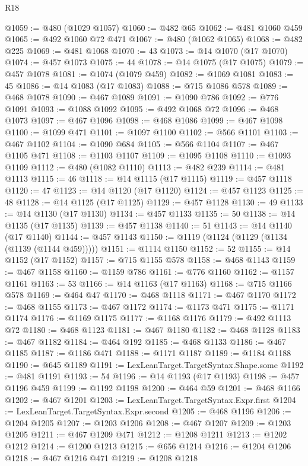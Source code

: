 \begin{lexlean}{R18}
\begin{coremodule}
@1059 := @480 (@1029 @1057)
@1060 := @482 @65
@1062 := @481 @1060 @459
@1065 := @492 @1060 @72 @471
@1067 := @480 (@1062 @1065)
@1068 := @482 @225
@1069 := @481 @1068
@1070 := 43
@1073 := @14 @1070 (@17 @1070)
@1074 := @457 @1073
@1075 := 44
@1078 := @14 @1075 (@17 @1075)
@1079 := @457 @1078
@1081 := @1074 (@1079 @459)
@1082 := @1069 @1081
@1083 := 45
@1086 := @14 @1083 (@17 @1083)
@1088 := @715 @1086 @578
@1089 := @468 @1078
@1090 := @467 @1089
@1091 := @1090 @786
@1092 := @776 @1091
@1093 := @1088 @1092
@1095 := @492 @1068 @72
@1096 := @468 @1073
@1097 := @467 @1096
@1098 := @468 @1086
@1099 := @467 @1098
@1100 := @1099 @471
@1101 := @1097 @1100
@1102 := @566 @1101
@1103 := @467 @1102
@1104 := @1090 @684
@1105 := @566 @1104
@1107 := @467 @1105 @471
@1108 := @1103 @1107
@1109 := @1095 @1108
@1110 := @1093 @1109
@1112 := @480 (@1082 @1110)
@1113 := @482 @239
@1114 := @481 @1113
@1115 := 46
@1118 := @14 @1115 (@17 @1115)
@1119 := @457 @1118
@1120 := 47
@1123 := @14 @1120 (@17 @1120)
@1124 := @457 @1123
@1125 := 48
@1128 := @14 @1125 (@17 @1125)
@1129 := @457 @1128
@1130 := 49
@1133 := @14 @1130 (@17 @1130)
@1134 := @457 @1133
@1135 := 50
@1138 := @14 @1135 (@17 @1135)
@1139 := @457 @1138
@1140 := 51
@1143 := @14 @1140 (@17 @1140)
@1144 := @457 @1143
@1150 := @1119 (@1124 (@1129 (@1134 (@1139 (@1144 @459)))))
@1151 := @1114 @1150
@1152 := 52
@1155 := @14 @1152 (@17 @1152)
@1157 := @715 @1155 @578
@1158 := @468 @1143
@1159 := @467 @1158
@1160 := @1159 @786
@1161 := @776 @1160
@1162 := @1157 @1161
@1163 := 53
@1166 := @14 @1163 (@17 @1163)
@1168 := @715 @1166 @578
@1169 := @464 @47
@1170 := @468 @1118
@1171 := @467 @1170
@1172 := @468 @1155
@1173 := @467 @1172
@1174 := @1173 @471
@1175 := @1171 @1174
@1176 := @1169 @1175
@1177 := @1168 @1176
@1179 := @492 @1113 @72
@1180 := @468 @1123
@1181 := @467 @1180
@1182 := @468 @1128
@1183 := @467 @1182
@1184 := @464 @192
@1185 := @468 @1133
@1186 := @467 @1185
@1187 := @1186 @471
@1188 := @1171 @1187
@1189 := @1184 @1188
@1190 := @645 @1189
@1191 := LexLeanTarget.TargetSyntax.Shape.some
@1192 := @481 @1191
@1193 := 54
@1196 := @14 @1193 (@17 @1193)
@1198 := @457 @1196 @459
@1199 := @1192 @1198
@1200 := @464 @59
@1201 := @468 @1166
@1202 := @467 @1201
@1203 := LexLeanTarget.TargetSyntax.Expr.first
@1204 := LexLeanTarget.TargetSyntax.Expr.second
@1205 := @468 @1196
@1206 := @1204 @1205
@1207 := @1203 @1206
@1208 := @467 @1207
@1209 := @1203 @1205
@1211 := @467 @1209 @471
@1212 := @1208 @1211
@1213 := @1202 @1212
@1214 := @1200 @1213
@1215 := @656 @1214
@1216 := @1204 @1206
@1218 := @467 @1216 @471
@1219 := @1208 @1218

\end{coremodule}
\end{lexlean}
